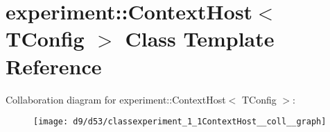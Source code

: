 \hypertarget{classexperiment_1_1ContextHost}{}\section{experiment\+:\+:Context\+Host$<$ T\+Config $>$ Class Template Reference}
\label{classexperiment_1_1ContextHost}


Collaboration diagram for experiment\+:\+:Context\+Host$<$ T\+Config $>$\+:\nopagebreak
\begin{figure}[H]
\begin{center}
\leavevmode
\texttt{[image: d9/d53/classexperiment\_1\_1ContextHost\_\_coll\_\_graph]}
\end{center}
\end{figure}
